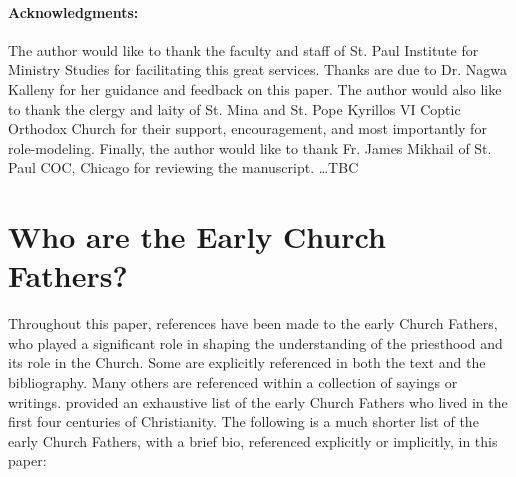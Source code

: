 \documentclass[12pt,doc]{apa7}   	%
\begin{document}
\vskip 0.5cm
\paragraph{Acknowledgments:} The author would like to thank the faculty and staff of St. Paul Institute for Ministry Studies for facilitating this great services.  Thanks are due to Dr. Nagwa Kalleny for her guidance and feedback on this paper.  The author would also like to thank the clergy and laity of St. Mina and St. Pope Kyrillos VI Coptic Orthodox Church for their support, encouragement, and most importantly for role-modeling.  Finally, the author would like to thank Fr. James Mikhail of St. Paul COC, Chicago for reviewing the manuscript.  \dots TBC 


\appendix{}
\section{Who are the Early Church Fathers?}\label{early_fathers}
Throughout this paper, references have been made to the early Church Fathers, who played a significant role in shaping the understanding of the priesthood and its role in the Church.  Some are explicitly referenced in both the text and the bibliography.  Many others are referenced within a collection of sayings or writings. \citet{early_church_akin} provided an exhaustive list of the early Church Fathers who lived in the first four centuries of Christianity.  The following is a much shorter list of the early Church Fathers, with a brief bio, referenced explicitly or implicitly, in this paper:
\end{document}
